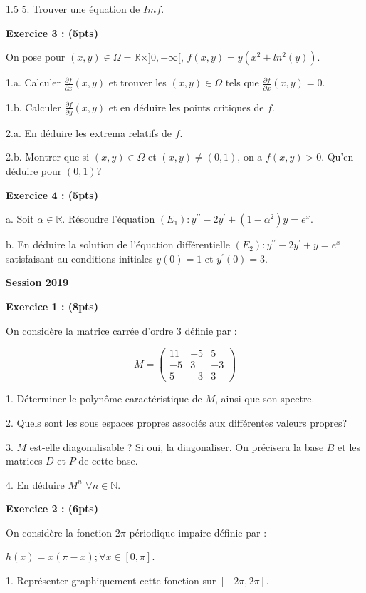 \documentclass[12pt]{article}
\begin{document}
\begin{spacing}{1.5}
5. Trouver une équation de $Imf$.

\textbf{Exercice 3 : (5pts)}

On pose pour $(x,y)\in\Omega=\mathbb{R}\times]0,+\infty[$,  $f(x,y)=y(x^2 + ln^2{(y)})$.

1.a. Calculer $\frac{\partial{f}}{\partial{x}}(x,y)$ et trouver les $(x,y)\in\Omega$ tels que $\frac{\partial{f}}{\partial{x}}(x,y) = 0$.

1.b. Calculer $\frac{\partial{f}}{\partial{y}}(x,y)$ et en déduire les points critiques de $f$.

2.a. En déduire les extrema relatifs de $f$.

2.b. Montrer que si $(x,y)\in\Omega$ et $(x,y)\neq(0,1)$, on a $f(x,y)>0$. Qu'en déduire pour $(0,1)$?

\textbf{Exercice 4 : (5pts)}

a. Soit $\alpha\in \mathbb{R}$. Résoudre l'équation $(E_1):y^{\prime\prime} -2y^{\prime} +(1-\alpha^2)y=e^x$.

b. En déduire la solution de l'équation différentielle $(E_2):y^{\prime\prime} -2y^{\prime}+y=e^x$ satisfaisant au conditions initiales $y(0)=1$ et $y^\prime(0)=3$.

\medskip

\textbf{Session 2019}

\textbf{Exercice 1 : (8pts)}

On considère la matrice carrée d'ordre 3 définie par  : 

\[M=\begin{pmatrix}
11 & -5 & 5 \\ 
-5 & 3 & -3 \\ 
5 & -3 & 3
\end{pmatrix}\]

1. Déterminer le polynôme caractéristique de $M$, ainsi que son spectre.

2. Quels sont les sous espaces propres associés aux différentes valeurs propres?

3. $M$ est-elle diagonalisable ? Si oui, la diagonaliser. On précisera la base $B$ et les matrices $D$ et $P$ de cette base.

4. En déduire $M^{n}$ $\forall n\in \mathbb{N}$.

\textbf{Exercice 2 : (6pts)}

On considère la fonction $2\pi$ périodique impaire définie par : 

$h(x)=x(\pi-x); \forall {x}\in [0,\pi]$.

1. Représenter graphiquement cette fonction sur $[-2\pi,2\pi]$.


\end{spacing}
\end{document}
